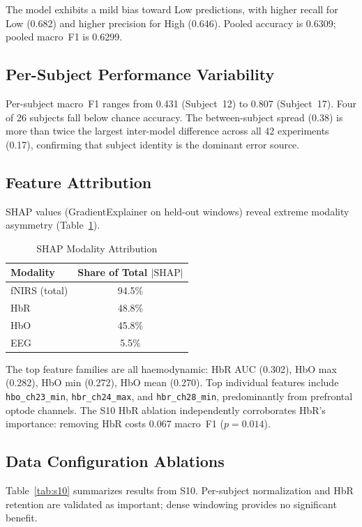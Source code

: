 \documentclass[conference]{IEEEtran}
\begin{document}
The model exhibits a mild bias toward Low predictions, with higher recall for Low (0.682) and higher precision for High (0.646). Pooled accuracy is 0.6309; pooled macro~F1 is 0.6299.

\subsection{Per-Subject Performance Variability}
Per-subject macro~F1 ranges from 0.431 (Subject~12) to 0.807 (Subject~17). Four of 26 subjects fall below chance accuracy. The between-subject spread (0.38) is more than twice the largest inter-model difference across all 42 experiments (0.17), confirming that subject identity is the dominant error source.

\subsection{Feature Attribution}
SHAP values (GradientExplainer on held-out windows) reveal extreme modality asymmetry (Table~\ref{tab:shap}).

\begin{table}[t]
\centering
\caption{SHAP Modality Attribution}
\label{tab:shap}
\begin{tabular}{lc}
\toprule
\textbf{Modality} & \textbf{Share of Total $|\mathrm{SHAP}|$} \\
\midrule
fNIRS (total) & 94.5\% \\
\quad HbR & 48.8\% \\
\quad HbO & 45.8\% \\
EEG & 5.5\% \\
\bottomrule
\end{tabular}
\end{table}

The top feature families are all haemodynamic: HbR AUC (0.302), HbO max (0.282), HbO min (0.272), HbO mean (0.270). Top individual features include \texttt{hbo\_ch23\_min}, \texttt{hbr\_ch24\_max}, and \texttt{hbr\_ch28\_min}, predominantly from prefrontal optode channels. The S10 HbR ablation independently corroborates HbR's importance: removing HbR costs 0.067 macro~F1 ($p = 0.014$).

\subsection{Data Configuration Ablations}
Table~\ref{tab:s10} summarizes results from S10. Per-subject normalization and HbR retention are validated as important; dense windowing provides no significant benefit.
\end{document}
